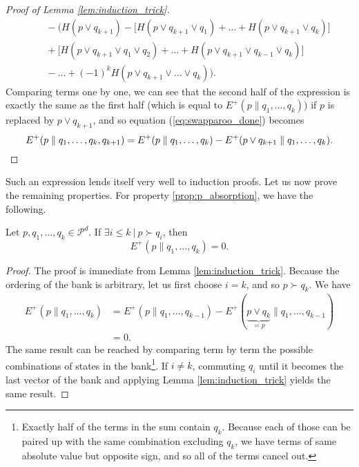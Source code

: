 \begin{proof}[Proof of Lemma \ref{lem:induction_trick}]
\begin{align}
                                                  &\quad - \Big(H(p \vee q_{k+1}) - \big[H(p \vee q_{k+1} \vee q_1) + \dots + H(p \vee q_{k+1} \vee q_k)\big]\nonumber \\
                                                  &\quad + \big[H(p \vee q_{k+1} \vee q_1 \vee q_2) + \dots + H(p \vee q_{k+1} \vee q_{k-1} \vee q_k)\big]\nonumber \\
                                                  &\quad - \dots + (-1)^{k} H(p \vee q_{k+1} \vee \dots \vee q_k)\Big).  \label{eq:swapparoo_done}
    \end{align}
    Comparing terms one by one, we can see that the second half of the expression is exactly the same as the first half (which is equal to $E^+(p \parallel q_1, \dots, q_k)$) if $p$ is replaced by $p \vee q_{k+1}$, and so equation (\ref{eq:swapparoo_done}) becomes
    \begin{equation}
        E^+(p \parallel q_1, \dots, q_k, q_{k+1}) = E^+(p \parallel q_1, \dots, q_k) - E^+(p \vee q_{k+1} \parallel q_1, \dots, q_k). \qedhere
    \end{equation}
\end{proof}

Such an expression lends itself very well to induction proofs. Let us now prove the remaining properties. For property \ref{prop:p_absorption}, we have the following.

\begin{appendix_lemma}
    Let $p, q_1, \dots, q_k \in \mathcal{P}^d$. If $\exists i \leq k \: | \: p \succ q_i$, then
    \begin{equation}
        E^+(p \parallel q_1, \dots, q_k) = 0.
    \end{equation}
\end{appendix_lemma}

\begin{proof}
    The proof is immediate from Lemma \ref{lem:induction_trick}. Because the ordering of the bank is arbitrary, let us first choose $i = k$, and so $p \succ q_k$. We have
    \begin{align}
        E^+(p \parallel q_1, \dots, q_k) &= E^+(p \parallel q_1, \dots, q_{k-1}) - E^+(\underbrace{p \vee q_k}_{= p} \parallel q_1, \dots, q_{k-1})\\
                                         &= 0.
    \end{align}
    The same result can be reached by comparing term by term the possible combinations of states in the bank\footnote{Exactly half of the terms in the sum contain $q_k$. Because each of those can be paired up with the same combination excluding $q_k$, we have terms of same absolute value but opposite sign, and so all of the terms cancel out.}. If $i \neq k$, commuting $q_i$ until it becomes the last vector of the bank and applying Lemma \ref{lem:induction_trick} yields the same result. \qedhere
\end{proof}


